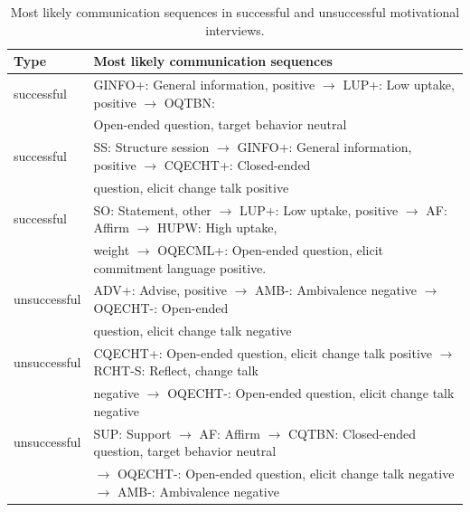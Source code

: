 \documentclass{amia_summit_2018}
\begin{document}
\begin{table}[h]
\centering
\caption{Most likely communication sequences in successful and unsuccessful motivational interviews.}
\label{tab:common_patterns}
  \begin{tabular}{|l|l|}
  \hline
   \textbf{Type} & \textbf{Most likely communication sequences} \\ \hline      
successful & GINFO+: General information, positive $\rightarrow $ LUP+: Low uptake, positive $\rightarrow $ OQTBN: \\ 
& Open-ended question, target behavior neutral \\\hline
successful & SS: Structure session $\rightarrow $ GINFO+: General information, positive $\rightarrow $ CQECHT+: Closed-ended \\
& question, elicit change talk positive\\\hline
successful & SO: Statement, other $\rightarrow $ LUP+: Low uptake, positive $\rightarrow $ AF: Affirm $\rightarrow $ HUPW: High uptake, \\
& weight $\rightarrow $ OQECML+: Open-ended question, elicit commitment language positive. \\\hline
unsuccessful & ADV+: Advise, positive $\rightarrow $ AMB-: Ambivalence negative $\rightarrow $ OQECHT-: Open-ended \\
& question, elicit change talk negative\\\hline
unsuccessful & CQECHT+: Open-ended question, elicit change talk positive $\rightarrow $ RCHT-S: Reflect, change talk \\
& negative $\rightarrow $ OQECHT-: Open-ended question, elicit change talk negative \\\hline
unsuccessful & SUP: Support $\rightarrow $ AF: Affirm $\rightarrow $ CQTBN: Closed-ended question, target behavior neutral \\
& $\rightarrow $ OQECHT-: Open-ended question, elicit change talk negative $\rightarrow $ AMB-: Ambivalence negative\\\hline
  \end{tabular}
\end{table} 
\end{document}
